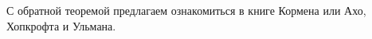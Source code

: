 \documentclass[a4paper, 12pt]{article}
\begin{document}
С обратной теоремой предлагаем ознакомиться в книге Кормена или Ахо, Хопкрофта и Ульмана.







\end{document}
